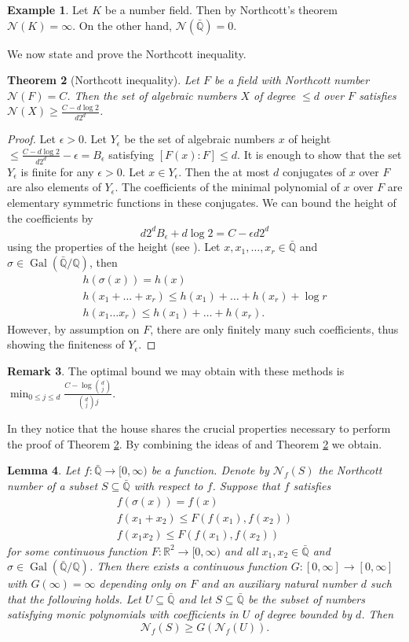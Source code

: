 \documentclass[11pt, a4paper, UKenglish]{amsart}
\newcommand{\N}{\mathcal N}
\newcommand{\Q}{\mathbb{Q}}
\newcommand{\Qbar}{\bar{\mathbb{Q}}}
\newcommand{\bbR}{\mathbb{R}}
\DeclareMathOperator{\Gal}{Gal}
\newcommand{\eqn}[1]{\begin{equation*}#1\end{equation*}}
\newtheorem{thm_}{Theorem}[section]
\newtheorem{lemma_}[thm_]{Lemma}
\theoremstyle{definition}
\newtheorem{eg_}[thm_]{Example}
\newtheorem{rk_}[thm_]{Remark}
\newcommand{\thm}[1]{\begin{thm_}#1\end{thm_}}
\newcommand{\lemm}[1]{\begin{lemma_}#1\end{lemma_}}
\newcommand{\eg}[1]{\begin{eg_}#1\end{eg_}}
\newcommand{\rk}[1]{\begin{rk_}#1\end{rk_}}
\newcommand{\pf}[1]{\begin{proof}#1\end{proof}}
\begin{document}
\eg{Let $K$ be a number field. Then by Northcott's theorem $\N(K) = \infty$. On the other hand, $\N(\Qbar) = 0$. }

We now state and prove the Northcott inequality.

\thm{[Northcott inequality]\label{nc} Let $F$ be a field with Northcott number $\mathcal{N}(F) = C$. Then the set of algebraic numbers $X$ of degree $\leq d$ over $F$ satisfies $\mathcal{N}(X)\geq \frac{C-d\log 2}{d2^d}$.}

\pf{Let $\epsilon > 0$. Let $Y_\epsilon$ be the set of algebraic numbers $x$ of height $\leq \frac{C-d\log 2}{d2^d}-\epsilon = B_\epsilon$ satisfying $[F(x):F]\leq d$. It is enough to show that the set $Y_\epsilon$ is finite for any $\epsilon > 0$. Let $x\in Y_\epsilon$. Then the at most $d$ conjugates of $x$ over $F$ are also elements of $Y_\epsilon$. The coefficients of the minimal polynomial of $x$ over $F$ are elementary symmetric functions in these conjugates. We can bound the height of the coefficients by
\eqn{d2^dB_\epsilon + d\log 2  = C - \epsilon d2^d}
using the properties of the height (see \cite[Prop. 1.5.15]{bombgubler}). Let $x, x_1, \dots, x_r \in \Qbar$ and $\sigma \in \Gal(\Qbar/\Q)$, then
\begin{align}
h(\sigma(x)) = h(x) \\
h(x_1+ \dots + x_r) \leq h(x_1) + \dots + h(x_r) + \log r \\ 
h(x_1 \dots x_r) \leq h(x_1) + \dots + h(x_r).
\end{align}
However, by assumption on $F$, there are only finitely many such coefficients, thus showing the finiteness of $Y_\epsilon$.
}

\rk{The optimal bound we may obtain with these methods is $\min_{0 \leq j \leq d} \frac{C-\log{d \choose j}}{{d \choose j}j}$.}

In \cite[Lemma 5]{fab} they notice that the house shares the crucial properties necessary to perform the proof of Theorem \ref{nc}. By combining the ideas of \cite[Lemma 5]{fab} and Theorem \ref{nc} we obtain.

\lemm{Let $f:\Qbar \to [0,\infty)$ be a function. Denote by $\N_f(S)$ the Northcott number of a subset $S \subseteq \Qbar$ with respect to $f$. Suppose that $f$ satisfies
\begin{align}
f(\sigma(x)) = f(x) \\
f(x_1+x_2) \leq F(f(x_1),f(x_2))\\ 
f(x_1 x_2) \leq F(f(x_1),f(x_2))
\end{align}
for some continuous function $F:\bbR^2 \to [0,\infty)$ and all $x_1,x_2 \in \Qbar$ and $\sigma \in \Gal(\Qbar/\Q)$. Then there exists a continuous function $G:[0,\infty] \to [0,\infty]$ with $G(\infty) = \infty$ depending only on $F$ and an auxiliary natural number $d$ such that the following holds. Let $U \subseteq \Qbar$ and let $S\subseteq \Qbar$ be the subset of numbers satisfying monic polynomials with coefficients in $U$ of degree bounded by $d$. Then
\eqn{\N_f(S) \geq G(\N_f(U)).}
}
\end{document}
